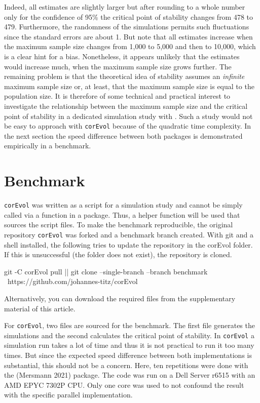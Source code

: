 Indeed, all estimates are slightly larger but after rounding to a whole number only for the confidence of 95\% the critical point of stability changes from 478 to 479. Furthermore, the randomness of the simulations permits such fluctuations since the standard errors are about 1. But note that all estimates increase when the maximum sample size changes from 1,000 to 5,000 and then to 10,000, which is a clear hint for a bias. Nonetheless, it appears unlikely that the estimates would increase much, when the maximum sample size grows further. The remaining problem is that the theoretical idea of stability assumes an \emph{infinite} maximum sample size or, at least, that the maximum sample size is equal to the population size. It is therefore of some technical and practical interest to investigate the relationship between the maximum sample size and the critical point of stability in a dedicated simulation study with . Such a study would not be easy to approach with \texttt{corEvol} because of the quadratic time complexity. In the next section the speed difference between both packages is demonstrated empirically in a benchmark.

\hypertarget{benchmark}{%
\section{Benchmark}\label{benchmark}}

\texttt{corEvol} was written as a script for a simulation study and cannot be simply called via a function in a package. Thus, a helper function will be used that sources the script files. To make the benchmark reproducible, the original repository \texttt{corEvol} was forked and a benchmark branch created. With git and a shell installed, the following tries to update the repository in the corEvol folder. If this is unsuccessful (the folder does not exist), the repository is cloned.

\begin{Schunk}
\begin{Sinput}
git -C corEvol pull || git clone --single-branch --branch benchmark \
  https://github.com/johannes-titz/corEvol
\end{Sinput}
\end{Schunk}

Alternatively, you can download the required files from the supplementary material of this article.

For \texttt{corEvol}, two files are sourced for the benchmark. The first file generates the simulations and the second calculates the critical point of stability. In \texttt{corEvol} a simulation run takes a lot of time and thus it is not practical to run it too many times. But since the expected speed difference between both implementations is substantial, this should not be a concern. Here, ten repetitions were done with the  (Mersmann 2021) package. The code was run on a Dell Server r6515 with an AMD EPYC 7302P CPU. Only one core was used to not confound the result with the specific parallel implementation.

